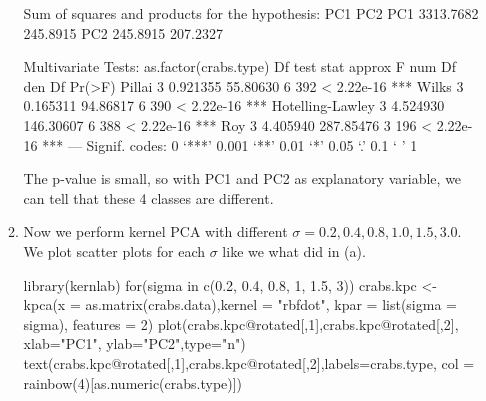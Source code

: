\documentclass{article}
\begin{document}
\begin{enumerate}[leftmargin = 0 em, label = \arabic*., font = \bfseries]
\begin{enumerate}
\begin{rcode}
Sum of squares and products for the hypothesis:
          PC1      PC2
PC1 3313.7682 245.8915
PC2  245.8915 207.2327

Multivariate Tests: as.factor(crabs.type)
                 Df test stat  approx F num Df den Df     Pr(>F)    
Pillai            3  0.921355  55.80630      6    392 < 2.22e-16 ***
Wilks             3  0.165311  94.86817      6    390 < 2.22e-16 ***
Hotelling-Lawley  3  4.524930 146.30607      6    388 < 2.22e-16 ***
Roy               3  4.405940 287.85476      3    196 < 2.22e-16 ***
---
Signif. codes:  0 ‘***’ 0.001 ‘**’ 0.01 ‘*’ 0.05 ‘.’ 0.1 ‘ ’ 1
\end{rcode}
The p-value is small, so with PC1 and PC2 as explanatory variable, we can tell that these 4 classes are different.

\item 

Now we perform kernel PCA with different $\sigma = 0.2, 0.4, 0.8, 1.0, 1.5, 3.0$. We plot scatter plots for each $\sigma$ like we what did in (a).
\begin{rcode}
library(kernlab)
for(sigma in c(0.2, 0.4, 0.8, 1, 1.5, 3)){
  crabs.kpc <- kpca(x = as.matrix(crabs.data),kernel = "rbfdot", kpar = list(sigma = sigma), features = 2)
  plot(crabs.kpc@rotated[,1],crabs.kpc@rotated[,2],
       xlab="PC1",
       ylab="PC2",type="n")
  text(crabs.kpc@rotated[,1],crabs.kpc@rotated[,2],labels=crabs.type, col = rainbow(4)[as.numeric(crabs.type)])  
}
\end{rcode}  


\end{enumerate}
\end{enumerate}
\end{document}
